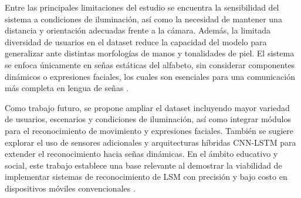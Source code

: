 	Entre las principales limitaciones del estudio se encuentra la sensibilidad del sistema a condiciones de iluminación, así como la necesidad de mantener una distancia y orientación adecuadas frente a la cámara. Además, la limitada diversidad de usuarios en el dataset reduce la capacidad del modelo para generalizar ante distintas morfologías de manos y tonalidades de piel. El sistema se enfoca únicamente en señas estáticas del alfabeto, sin considerar componentes dinámicos o expresiones faciales, los cuales son esenciales para una comunicación más completa en lengua de señas \cite{mendoza2025lsm_mobile}.
	
	Como trabajo futuro, se propone ampliar el dataset incluyendo mayor variedad de usuarios, escenarios y condiciones de iluminación, así como integrar módulos para el reconocimiento de movimiento y expresiones faciales. También se sugiere explorar el uso de sensores adicionales y arquitecturas híbridas CNN-LSTM para extender el reconocimiento hacia señas dinámicas. En el ámbito educativo y social, este trabajo establece una base relevante al demostrar la viabilidad de implementar sistemas de reconocimiento de LSM con precisión y bajo costo en dispositivos móviles convencionales \cite{mendoza2025lsm_mobile}.
	
	\small
	\renewcommand{\arraystretch}{1.15}
	
